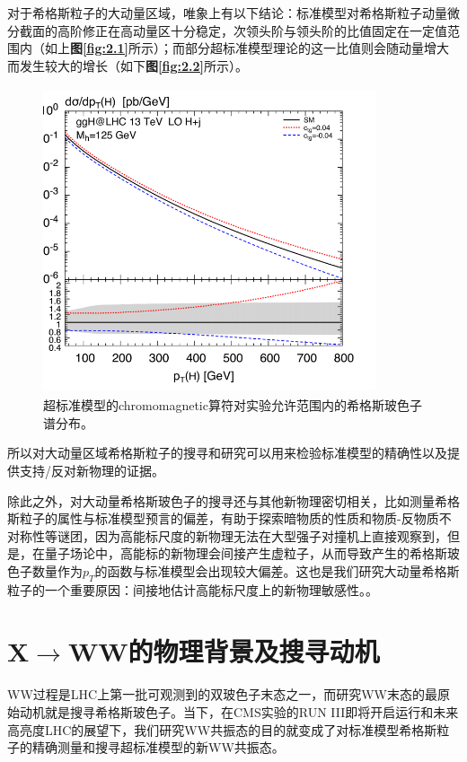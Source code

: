 对于希格斯粒子的大动量区域，唯象上有以下结论\cite{Higgs_high_pt}：标准模型对希格斯粒子动量微分截面的高阶修正在高动量区十分稳定，次领头阶与领头阶的比值固定在一定值范围内（如上\textbf{图\ref{fig:2.1}}所示）；而部分超标准模型理论\cite{Higgs_high_pt_BSM}的这一比值则会随动量增大而发生较大的增长（如下\textbf{图\ref{fig:2.2}}所示）。
\begin{figure}[H]
 \centering
 \includegraphics[height=9cm, width=9.8cm]{pictures/BSM_NLO:LO.png}
  \caption{超标准模型的chromomagnetic算符对实验允许范围内的希格斯玻色子谱分布。\cite{Higgs_high_pt_BSM}}
 \label{fig:2.3}
\end{figure}
所以对大动量区域希格斯粒子的搜寻和研究可以用来检验标准模型的精确性以及提供支持/反对新物理的证据。

除此之外，对大动量希格斯玻色子的搜寻还与其他新物理密切相关，比如测量希格斯粒子的属性与标准模型预言的偏差，有助于探索暗物质的性质和物质-反物质不对称性等谜团，因为高能标尺度的新物理无法在大型强子对撞机上直接观察到，但是，在量子场论中，高能标的新物理会间接产生虚粒子，从而导致产生的希格斯玻色子数量作为$p_T$的函数与标准模型会出现较大偏差。这也是我们研究大动量希格斯粒子的一个重要原因：间接地估计高能标尺度上的新物理敏感性。。

\section{X$\to$WW的物理背景及搜寻动机}
WW过程是LHC上第一批可观测到的双玻色子末态之一，而研究WW末态的最原始动机就是搜寻希格斯玻⾊⼦。当下，在CMS实验的RUN III即将开启运行和未来高亮度LHC的展望下，我们研究WW共振态的目的就变成了对标准模型希格斯粒子的精确测量和搜寻超标准模型的新WW共振态。
